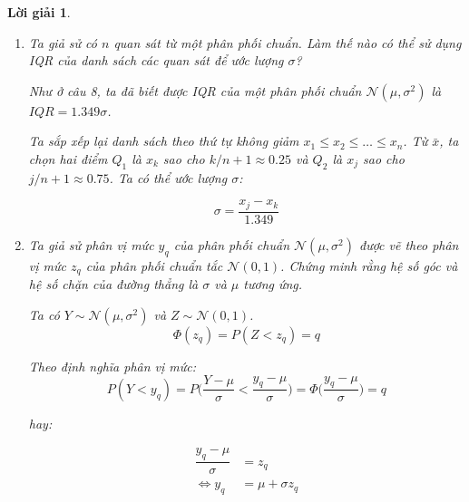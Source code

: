 \documentclass[14pt, a4paper]{article}
\theoremstyle{sltheorem}
\theoremstyle{soltheorem}
\newtheorem*{loigiai}{Lời giải}
\begin{document}
\begin{loigiai}
\begin{enumerate}[wide, labelwidth=!, labelindent=0pt,label=\textbf{\arabic*}.]
        Ta nhận thấy khi thay $x_n$ bởi một số lớn thì trung vị (giá trị) chia danh sách làm hai nửa không bị ảnh hưởng.
        Và $Q_1, Q_3$ cũng không bị thay đổi dẫn đến $IQR = Q_3 - Q_1$ không thay đổi. 
        Vậy nên điều tương tự không đúng với trung vị và IQR.

        \item Ta giả sử có $n$ quan sát từ một phân phối chuẩn. Làm thế nào có thể sử dụng IQR của danh sách các quan sát để ước lượng $\sigma$?
        
        Như ở câu 8, ta đã biết được IQR của một phân phối chuẩn $\mathcal{N}(\mu, \sigma^2)$ là $IQR=1.349\sigma$.

        Ta sắp xếp lại danh sách theo thứ tự không giảm $x_1 \leq x_2 \leq \dots \leq x_n$.
        Từ $\bar{x}$, ta chọn hai điểm $Q_1$ là $x_k$ sao cho $k / n + 1 \approx 0.25$ và $Q_2$ là $x_j$ sao cho $j/ n+1 \approx 0.75$.
        Ta có thể ước lượng $\sigma$:

        \begin{equation*}
            \sigma = \dfrac{x_j - x_k}{1.349}
        \end{equation*}

        \item Ta giả sử phân vị mức $y_q$ của phân phối chuẩn $\mathcal{N}(\mu, \sigma^2)$ được vẽ theo phân vị mức $z_q$ của phân phối chuẩn tắc $\mathcal{N}(0, 1)$.
        Chứng minh rằng hệ số góc và hệ số chặn của đường thẳng là $\sigma$ và $\mu$ tương ứng.

        Ta có $Y \sim \mathcal{N}(\mu, \sigma^2)$ và $Z \sim \mathcal{N}(0, 1)$.
        \begin{equation*}
            \Phi(z_q) = P(Z < z_q) = q
        \end{equation*}

        Theo định nghĩa phân vị mức:
        \begin{equation*}
            P(Y < y_q) = P\Big(\dfrac{Y - \mu}{\sigma} < \dfrac{y_q - \mu}{\sigma}\Big) = \Phi\Big(\dfrac{y_q - \mu}{\sigma}\Big) = q
        \end{equation*}

        hay:

        \begin{equation*}
            \begin{aligned}
                \dfrac{y_q - \mu}{\sigma} &= z_q \\
                \Leftrightarrow y_q &= \mu + \sigma z_q
            \end{aligned}
        \end{equation*}


\end{enumerate}
\end{loigiai}
\end{document}
